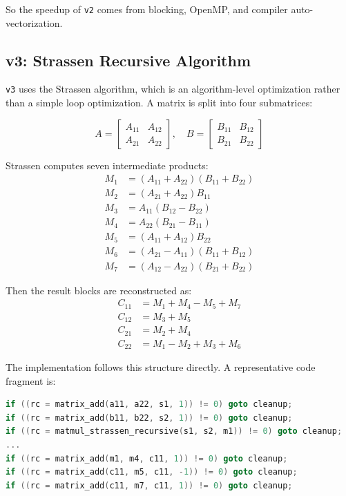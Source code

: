 \documentclass[11pt,a4paper]{article}
\begin{document}
So the speedup of \texttt{v2} comes from blocking, OpenMP, and compiler auto-vectorization.

\subsection{v3: Strassen Recursive Algorithm}
\texttt{v3} uses the Strassen algorithm, which is an algorithm-level optimization rather than a simple loop optimization. A matrix is split into four submatrices:

\[
A = \begin{bmatrix} A_{11} & A_{12} \\ A_{21} & A_{22} \end{bmatrix},
\quad
B = \begin{bmatrix} B_{11} & B_{12} \\ B_{21} & B_{22} \end{bmatrix}
\]

Strassen computes seven intermediate products:
\[
\begin{aligned}
M_1 &= (A_{11} + A_{22})(B_{11} + B_{22}) \\
M_2 &= (A_{21} + A_{22})B_{11} \\
M_3 &= A_{11}(B_{12} - B_{22}) \\
M_4 &= A_{22}(B_{21} - B_{11}) \\
M_5 &= (A_{11} + A_{12})B_{22} \\
M_6 &= (A_{21} - A_{11})(B_{11} + B_{12}) \\
M_7 &= (A_{12} - A_{22})(B_{21} + B_{22})
\end{aligned}
\]

Then the result blocks are reconstructed as:
\[
\begin{aligned}
C_{11} &= M_1 + M_4 - M_5 + M_7 \\
C_{12} &= M_3 + M_5 \\
C_{21} &= M_2 + M_4 \\
C_{22} &= M_1 - M_2 + M_3 + M_6
\end{aligned}
\]

The implementation follows this structure directly. A representative code fragment is:

\begin{lstlisting}[language=C]
if ((rc = matrix_add(a11, a22, s1, 1)) != 0) goto cleanup;
if ((rc = matrix_add(b11, b22, s2, 1)) != 0) goto cleanup;
if ((rc = matmul_strassen_recursive(s1, s2, m1)) != 0) goto cleanup;
...
if ((rc = matrix_add(m1, m4, c11, 1)) != 0) goto cleanup;
if ((rc = matrix_add(c11, m5, c11, -1)) != 0) goto cleanup;
if ((rc = matrix_add(c11, m7, c11, 1)) != 0) goto cleanup;
\end{lstlisting}
\end{document}

